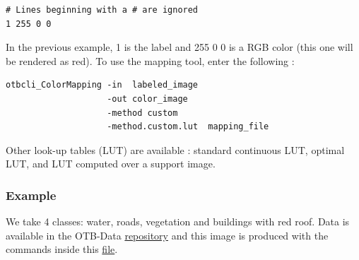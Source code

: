 \begin{verbatim}
# Lines beginning with a # are ignored
1 255 0 0
\end{verbatim}

In the previous example, 1 is the label and 255 0 0 is a RGB color 
(this one will be rendered as red). To use the mapping tool, enter 
the following :

\begin{verbatim}
otbcli_ColorMapping -in  labeled_image 
                    -out color_image
                    -method custom
                    -method.custom.lut  mapping_file
\end{verbatim}

Other look-up tables (LUT) are available : standard continuous LUT, 
optimal LUT, and LUT computed over a support image. 

\subsubsection{Example}
We take 4 classes: water, roads, vegetation and buildings with red roof.
Data is available in the OTB-Data 
\href{http://hg.orfeo-toolbox.org/OTB-Data/file/0fed8f4f035c/Input/Classification}{repository} 
and this image is produced with the commands inside this 
\href{http://hg.orfeo-toolbox.org/OTB-Applications/file/3ce975605013/Testing/Classification/CMakeLists.txt}{file}. 

